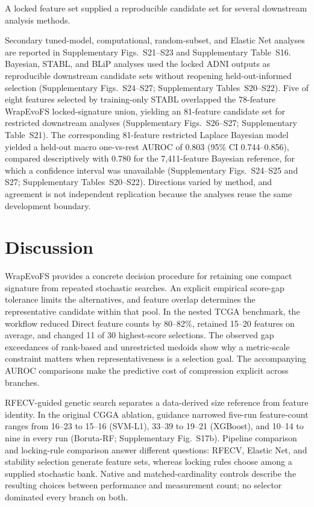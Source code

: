 A locked feature set supplied a reproducible candidate set for several downstream analysis methods.

Secondary tuned-model, computational, random-subset, and Elastic Net analyses are reported in Supplementary Figs.~S21--S23 and Supplementary Table~S16. Bayesian, STABL, and BLiP analyses used the locked ADNI outputs as reproducible downstream candidate sets without reopening held-out-informed selection (Supplementary Figs.~S24--S27; Supplementary Tables~S20--S22). Five of eight features selected by training-only STABL overlapped the 78-feature WrapEvoFS locked-signature union, yielding an 81-feature candidate set for restricted downstream analyses (Supplementary Figs.~S26--S27; Supplementary Table~S21). The corresponding 81-feature restricted Laplace Bayesian model yielded a held-out macro one-vs-rest AUROC of 0.803 (95\% CI 0.744--0.856), compared descriptively with 0.780 for the 7,411-feature Bayesian reference, for which a confidence interval was unavailable (Supplementary Figs.~S24--S25 and S27; Supplementary Tables~S20--S22). Directions varied by method, and agreement is not independent replication because the analyses reuse the same development boundary.

\FloatBarrier
\section{Discussion}

WrapEvoFS provides a concrete decision procedure for retaining one compact signature from repeated stochastic searches. An explicit empirical score-gap tolerance limits the alternatives, and feature overlap determines the representative candidate within that pool. In the nested TCGA benchmark, the workflow reduced Direct feature counts by 80--82\%, retained 15--20 features on average, and changed 11 of 30 highest-score selections. The observed gap exceedances of rank-based and unrestricted medoids show why a metric-scale constraint matters when representativeness is a selection goal. The accompanying AUROC comparisons make the predictive cost of compression explicit across branches.

RFECV-guided genetic search separates a data-derived size reference from feature identity. In the original CGGA ablation, guidance narrowed five-run feature-count ranges from 16--23 to 15--16 (SVM-L1), 33--39 to 19--21 (XGBoost), and 10--14 to nine in every run (Boruta-RF; Supplementary Fig.~S17b). Pipeline comparison and locking-rule comparison answer different questions: RFECV, Elastic Net, and stability selection generate feature sets, whereas locking rules choose among a supplied stochastic bank. Native and matched-cardinality controls describe the resulting choices between performance and measurement count; no selector dominated every branch on both.

